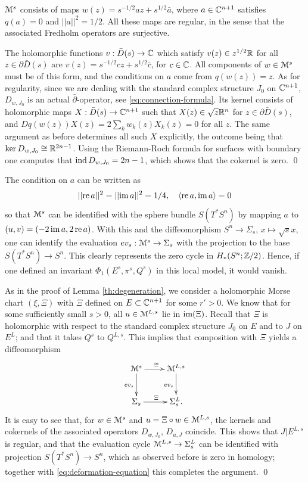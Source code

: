 \documentclass[10pt,letterpaper]{article}
\begin{document}
\begin{lemma} \label{th:explicit-sections}
$\mathcal{M}^s$ consists of maps $w(z) = s^{-1/2} az + s^{1/2} \bar{a}$, where $a \in
\mathbb{C}^{n+1}$ satisfies $q(a) = 0$ and $||a||^2 = 1/2$. All these maps are regular,
in the sense that the associated Fredholm operators are surjective.
\end{lemma}

\proof The holomorphic functions $v: \bar{D}(s) \rightarrow \mathbb{C}$ which satisfy
$v(z) \in z^{1/2}\mathbb{R}$ for all $z \in \partial \bar{D}(s)$ are $v(z) = s^{-1/2} c
z + s^{1/2} \bar{c}$, for $c \in \mathbb{C}$. All components of $w \in \mathcal{M}^s$ must be
of this form, and the conditions on $a$ come from $q(w(z)) = z$. As for
regularity, since we are dealing with the standard complex structure $J_0$ on
$\mathbb{C}^{n+1}$, $D_{w,J_0}$ is an actual $\bar\partial$-operator, see
\eqref{eq:connection-formula}. Its kernel consists of holomorphic maps $X:
\bar{D}(s) \rightarrow \mathbb{C}^{n+1}$ such that $X(z) \in \sqrt{z}\mathbb{R}^n$ for $z \in
\partial \bar{D}(s)$, and $Dq(w(z))X(z) = 2 \sum_k w_k(z) X_k(z) = 0$ for all
$z$. The same argument as before determines all such $X$ explicitly, the
outcome being that $\mathrm{ker}\,D_{w,J_0} \cong \mathbb{R}^{2n-1}$. Using the Riemann-Roch
formula for surfaces with boundary one computes that $\mathrm{ind}\,D_{w,J_0} = 2n-1$,
which shows that the cokernel is zero. \qed

The condition on $a$ can be written as
\[
||\mathrm{re}\,a||^2 = ||\mathrm{im}\,a||^2 = 1/4, \quad \langle \mathrm{re}\,a,  \mathrm{im}\,a \rangle = 0
\]
so that $\mathcal{M}^s$ can be identified with the sphere bundle $S(T^*S^n)$ by mapping
$a$ to $(u,v) = (-2\, \mathrm{im}\,a, 2\, \mathrm{re}\,a)$. With this and the diffeomorphism
$S^n \rightarrow \Sigma_s$, $x \mapsto \sqrt{s}x$, one can identify the
evaluation $ev_s: \mathcal{M}^s \rightarrow \Sigma_s$ with the projection to the base
$S(T^*S^n) \rightarrow S^n$. This clearly represents the zero cycle in
$H_*(S^n;\mathbb{Z}/2)$. Hence, if one defined an invariant $\Phi_1(E^s,\pi^s,Q^s)$ in
this local model, it would vanish.

 As in the proof of Lemma
\ref{th:degeneration}, we consider a holomorphic Morse chart $(\xi,\Xi)$ with
$\Xi$ defined on $E \subset \mathbb{C}^{n+1}$ for some $r'>0$. We know that for some
sufficiently small $s>0$, all $u \in \mathcal{M}^{L,s}$ lie in $\mathrm{im}(\Xi)$. Recall that
$\Xi$ is holomorphic with respect to the standard complex structure $J_0$ on
$E$ and to $J$ on $E^L$; and that it takes $Q^s$ to $Q^{L,s}$. This implies
that composition with $\Xi$ yields a diffeomorphism
\[
\xymatrix{
 {\MM^s} \ar[r]^{\iso} \ar[d]_{ev_s} & {\MM^{L,s}} \ar[d]_{ev_s} \\
 {\Sigma_s} \ar[r]^{\Xi} & {\Sigma^L_s.}
}
\]
It is easy to see that, for $w \in \mathcal{M}^s$ and $u = \Xi \circ w \in \mathcal{M}^{L,s}$,
the kernels and cokernels of the associated operators $D_{w,J_0}$, $D_{u,J}$
coincide. This shows that $J|E^{L,s}$ is regular, and that the evaluation cycle
$\mathcal{M}^{L,s} \rightarrow \Sigma^L_s$ can be identified with projection $S(T^*S^n)
\rightarrow S^n$, which as observed before is zero in homology; together with
\eqref{eq:deformation-equation} this completes the argument. \qed
\end{document}
